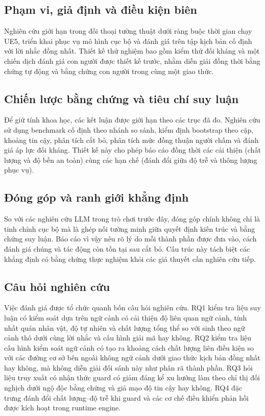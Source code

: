 ﻿\documentclass[a4paper,12pt]{article}
\begin{document}
\subsection{Phạm vi, giả định và điều kiện biên}
Nghiên cứu giới hạn trong đối thoại tường thuật dưới ràng buộc thời gian chạy UE5, triển khai phục vụ mô hình cục bộ và đánh giá trên tập kịch bản cố định với lời nhắc đồng nhất. Thiết kế thử nghiệm bao gồm kiểm thử đối kháng và một chiến dịch đánh giá con người được thiết kế trước, nhằm diễn giải đồng thời bằng chứng tự động và bằng chứng con người trong cùng một giao thức.

\subsection{Chiến lược bằng chứng và tiêu chí suy luận}
Để giữ tính khoa học, các kết luận được giới hạn theo các trục đã đo. Nghiên cứu sử dụng benchmark cố định theo nhánh so sánh, kiểm định bootstrap theo cặp, khoảng tin cậy, phân tích cắt bỏ, phân tích mức đồng thuận người chấm và đánh giá áp lực đối kháng. Thiết kế này cho phép báo cáo đồng thời các cải thiện (chất lượng và độ bền an toàn) cùng các hạn chế (đánh đổi giữa độ trễ và thông lượng phục vụ).

\subsection{Đóng góp và ranh giới khẳng định}
So với các nghiên cứu LLM trong trò chơi trước đây, đóng góp chính không chỉ là tinh chỉnh cục bộ mà là ghép nối tường minh giữa quyết định kiến trúc và bằng chứng suy luận. Báo cáo vì vậy nêu rõ lý do mỗi thành phần được đưa vào, cách đánh giá chúng và tác động còn tồn tại sau cắt bỏ. Cấu trúc này tách biệt các khẳng định có bằng chứng thực nghiệm khỏi các giả thuyết cần nghiên cứu tiếp.

\subsection{Câu hỏi nghiên cứu}
Việc đánh giá được tổ chức quanh bốn câu hỏi nghiên cứu. RQ1 kiểm tra liệu suy luận có kiểm soát dựa trên ngữ cảnh có cải thiện độ liên quan ngữ cảnh, tính nhất quán nhân vật, độ tự nhiên và chất lượng tổng thể so với sinh theo ngữ cảnh thô dưới cùng lời nhắc và cấu hình giải mã hay không. RQ2 kiểm tra liệu cấu hình kiểm soát ngữ cảnh có tạo ra khoảng cách chất lượng liên điều kiện so với các đường cơ sở bên ngoài không ngữ cảnh dưới giao thức kịch bản đồng nhất hay không, mà không diễn giải đối sánh này như phân rã thành phần. RQ3 hỏi liệu truy xuất có nhận thức guard có giảm đáng kể xu hướng làm theo chỉ thị đối nghịch dưới ngộ độc bằng chứng và giả mạo độ tin cậy hay không. RQ4 đặc trưng đánh đổi chất lượng--độ trễ khi guard và các cơ chế điều khiển phản hồi được kích hoạt trong runtime engine.
\end{document}
